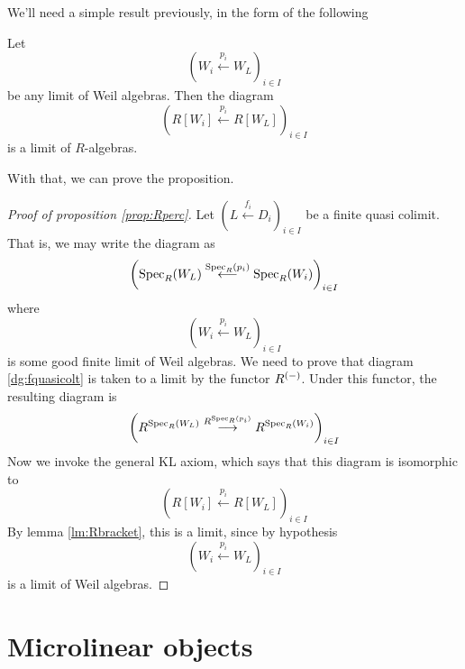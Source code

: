 We'll need a simple result previously, in the form of the following

\begin{lemma}
  Let 
  \begin{equation*}
   \left(W_i\stackrel{p_i}{\longleftarrow}W_L\right)_{i\in I}
  \end{equation*}
  be any limit of Weil algebras. Then the diagram
  \begin{equation*}
    \left(R[W_i]\stackrel{p_i}{\longleftarrow}R[W_L]\right)_{i\in I}
  \end{equation*}
  is a limit of \( R \)-algebras.  
  \label{lm:Rbracket}
\end{lemma}

With that, we can prove the proposition.

\begin{proof}[Proof of proposition \ref{prop:Rperc}]
  Let \( \left(L\stackrel{f_i}{\longleftarrow}D_i\right)_{i\in I} \) be a finite quasi colimit. That is, we may write the diagram as
  \begin{equation}
    \left(\operatorname{Spec}_R(W_L)\stackrel{\operatorname{Spec}_R(p_i)}{\longleftarrow}\operatorname{Spec}_R(W_i)\right)_{i\in I}
    \label{dg:fquasicolt}
  \end{equation}
  where
  \begin{equation*}
   \left(W_i\stackrel{p_i}{\longleftarrow}W_L\right)_{i\in I}
  \end{equation*}
  is some good finite limit of Weil algebras. We need to prove that diagram \ref{dg:fquasicolt} is taken to a limit by the functor \( R^{(-)} \). Under this functor, the resulting diagram is
  \begin{equation}
    \left(R^{\operatorname{Spec}_R(W_L)}\stackrel{R^{\operatorname{Spec}_R(p_i)}}{\longrightarrow}R^{\operatorname{Spec}_R(W_i)}\right)_{i\in I}
    \label{dg:Rfqc}
  \end{equation}
  Now we invoke the general KL axiom, which says that this diagram is isomorphic to
  \begin{equation*}
    \left(R[W_i]\stackrel{p_i}{\longleftarrow}R[W_L]\right)_{i\in I}
  \end{equation*}
  By lemma \ref{lm:Rbracket}, this is a limit, since by hypothesis
  \begin{equation*}
   \left(W_i\stackrel{p_i}{\longleftarrow}W_L\right)_{i\in I}
  \end{equation*} 
  is a limit of Weil algebras.
\end{proof}

\section{Microlinear objects}

